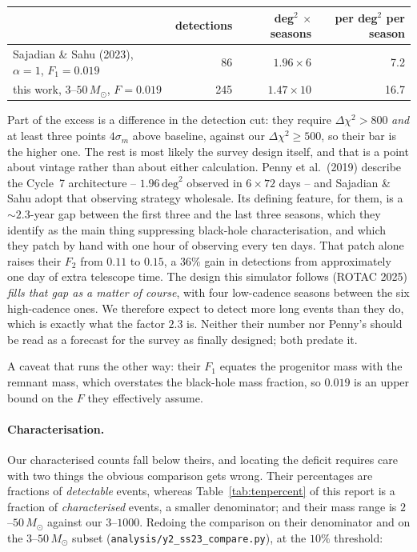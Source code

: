 \documentclass[english,10pt,a4paper]{article}
\newcommand{\Msun}{M_\odot}
\begin{document}
\begin{center}
\begin{tabular}{lrrr}
\toprule
 & detections & deg$^2$ $\times$ seasons & per deg$^2$ per season \\
\midrule
Sajadian \& Sahu (2023), $\alpha=1$, $F_1=0.019$ & 86  & $1.96\times6$  & 7.2 \\
this work, $3$--$50\,\Msun$, $F=0.019$           & 245 & $1.47\times10$ & 16.7 \\
\bottomrule
\end{tabular}
\end{center}

Part of the excess is a difference in the detection cut: they require
$\Delta\chi^2 > 800$ \emph{and} at least three points $4\sigma_m$ above baseline, against our
$\Delta\chi^2 \ge 500$, so their bar is the higher one. The rest is most likely the survey design
itself, and that is a point about vintage rather than about either calculation. Penny et al.\ (2019) describe the Cycle~7 architecture --
$1.96\,\mathrm{deg}^2$ observed in $6\times72$ days -- and Sajadian \& Sahu adopt that observing
strategy wholesale. Its defining feature, for them, is a $\sim\!2.3$-year gap between the first
three and the last three seasons, which they identify as the main thing suppressing black-hole
characterisation, and which they patch by hand with one hour of observing every ten days. That
patch alone raises their $F_2$ from $0.11$ to $0.15$, a $36\%$ gain in detections from
approximately one day of extra telescope time. The design this simulator follows (ROTAC 2025)
\emph{fills that gap as a matter of course}, with four low-cadence seasons between the six
high-cadence ones. We therefore expect to detect more long events than they do, which is exactly
what the factor $2.3$ is. Neither their number nor Penny's should be read as a forecast for the
survey as finally designed; both predate it.

A caveat that runs the other way: their $F_1$ equates the progenitor mass with the remnant mass,
which overstates the black-hole mass fraction, so $0.019$ is an upper bound on the $F$ they
effectively assume.

\paragraph{Characterisation.} Our characterised counts fall below theirs, and locating the
deficit requires care with two things the obvious comparison gets wrong. Their percentages are
fractions of \emph{detectable} events, whereas Table~\ref{tab:tenpercent} of this report is a
fraction of \emph{characterised} events, a smaller denominator; and their mass range is
$2$--$50\,\Msun$ against our $3$--$1000$. Redoing the comparison on their denominator and on the
$3$--$50\,\Msun$ subset (\texttt{analysis/y2\_ss23\_compare.py}), at the $10\%$ threshold:
\end{document}

